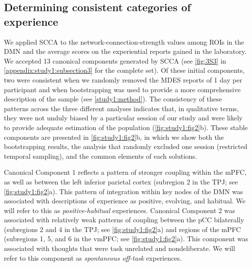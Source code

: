 \subsection{Determining consistent categories of experience}
\label{study1:results:a}
We applied SCCA to the network-connection-strength values among ROIs in the DMN and the average scores on the experiential reports gained in the laboratory. We accepted 13 canonical components generated by SCCA (see \cref{fig:3S3} in \cref{appendix:study1:subsection3} for the complete set). Of these initial components, two were consistent when we randomly removed the MDES reports of 1 day per participant and when bootstrapping was used to provide a more comprehensive description of the sample (see \cref{study1:method}). The consistency of these patterns across the three different analyses indicates that, in qualitative terms, they were not unduly biased by a particular session of our study and were likely to provide adequate estimation of the population (\cref{fig:study1:fig2}b). These stable components are presented in \cref{fig:study1:fig2}b, in which we show both the bootstrapping results, the analysis that randomly excluded one session (restricted temporal sampling), and the common elements of each solutions.

Canonical Component 1 reflects a pattern of stronger coupling within the mPFC, as well as between the left inferior parietal cortex (subregion 2 in the TPJ; see \cref{fig:study1:fig2}a). This pattern of integration within key nodes of the DMN was associated with descriptions of experience as positive, evolving, and habitual. We will refer to this as \textit{positive-habitual} experiences. Canonical Component 2 was associated with relatively weak patterns of coupling between the pCC bilaterally (subregions 2 and 4 in the TPJ; see \cref{fig:study1:fig2}a) and regions of the mPFC (subregions 1, 5, and 6 in the vmPFC; see \cref{fig:study1:fig2}a). This component was associated with thoughts that were task unrelated and nondeliberate. We will refer to this component as \textit{spontaneous off-task} experiences.

